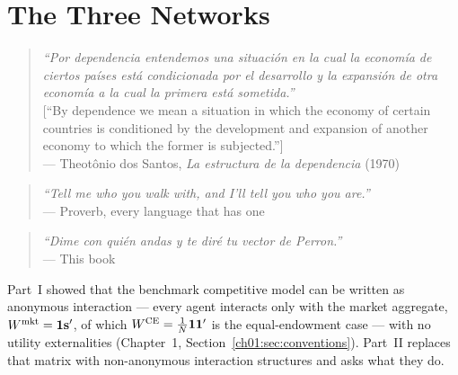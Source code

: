 \documentclass[../structural_economics_book.tex]{subfiles}
\begin{document}
\ifSubfilesClassLoaded{\setcounter{chapter}{4}}{}
\chapter{The Three Networks}\label{ch:05}
\begin{quote}
\textit{``Por dependencia entendemos una situaci\'{o}n en la cual la econom\'{i}a de ciertos pa\'{i}ses est\'{a} condicionada por el desarrollo y la expansi\'{o}n de otra econom\'{i}a a la cual la primera est\'{a} sometida.''}\\[0.3em]
\textnormal{[``By dependence we mean a situation in which the economy of certain countries is conditioned by the development and expansion of another economy to which the former is subjected.'']}\\
\hfill --- Theot\^{o}nio dos Santos, \textit{La estructura de la dependencia} (1970)
\end{quote}
\nocite{dossantos1970structure}

\vspace{0.3em}

\begin{quote}
\textit{``Tell me who you walk with, and I'll tell you who you are.''}\\
\hfill --- Proverb, every language that has one
\end{quote}

\vspace{0.5em}

\begin{quote}
\textit{``Dime con qui\'{e}n andas y te dir\'{e} tu vector de Perron.''}\\
\hfill --- This book
\end{quote}

\vspace{1em}

Part~I showed that the benchmark competitive model can be written as anonymous interaction --- every agent interacts only with the market aggregate, $W^{\text{mkt}} = \mathbf{1}\mathbf{s}'$, of which $W^{\text{CE}} = \frac{1}{N}\mathbf{1}\mathbf{1}'$ is the equal-endowment case --- with no utility externalities (Chapter~1, Section~\ref{ch01:sec:conventions}). Part~II replaces that matrix with non-anonymous interaction structures and asks what they do.
\end{document}
